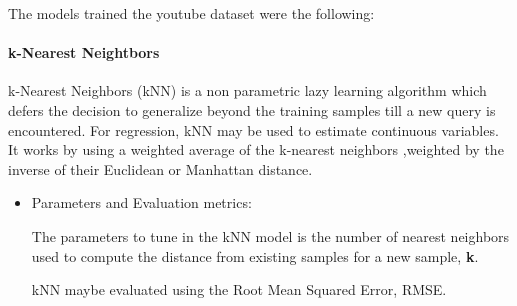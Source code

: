 \documentclass[letterpaper,12pt,titlepage,oneside,final]{report}
\begin{document}
            The models trained the youtube dataset were the following:
                \paragraph{k-Nearest Neightbors}
                    k-Nearest Neighbors (kNN) is a non parametric lazy learning algorithm which defers the decision to generalize beyond the training samples till a new query is encountered. For regression, kNN may be used to estimate continuous variables. It works by using a weighted average of the k-nearest neighbors ,weighted by the inverse of their Euclidean or Manhattan distance.
                    \begin{itemize}

                    \item{Parameters and Evaluation metrics:} %

                        The parameters to tune in the kNN model is the number of nearest neighbors used to compute the distance from existing samples for a new sample, \textbf{k}.

                        kNN maybe evaluated using the Root Mean Squared Error, RMSE.
                    
                    \end{itemize}
\end{document}
